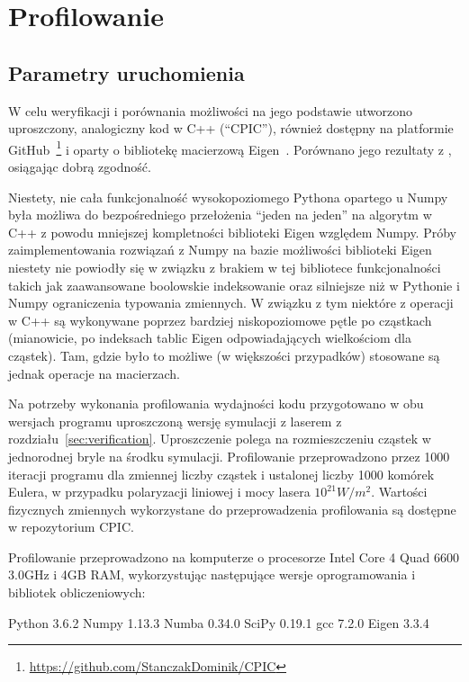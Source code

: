 \section[Profilowanie]{Profilowanie}\label{sec:profiling} 

\subsection{Parametry uruchomienia}

W celu weryfikacji i porównania możliwości \pythonpic{} na jego podstawie
utworzono uproszczony, analogiczny kod w C++ (``CPIC''), również dostępny na platformie
GitHub~\footnote{\url{https://github.com/StanczakDominik/CPIC}} i oparty o bibliotekę macierzową Eigen~\cite{eigen}.
Porównano jego rezultaty z \pythonpic{}, osiągając dobrą zgodność.

Niestety, nie cała funkcjonalność wysokopoziomego Pythona opartego u Numpy była możliwa do bezpośredniego przełożenia ``jeden na jeden'' na algorytm
w C++ z powodu mniejszej kompletności biblioteki Eigen względem Numpy. Próby zaimplementowania rozwiązań z Numpy na bazie możliwości biblioteki Eigen niestety nie powiodły się w związku z
brakiem w tej bibliotece funkcjonalności takich jak zaawansowane boolowskie indeksowanie oraz silniejsze niż w Pythonie i Numpy ograniczenia typowania zmiennych.  
W związku z tym niektóre z operacji w C++ są wykonywane poprzez bardziej niskopoziomowe pętle po cząstkach (mianowicie, po indeksach tablic Eigen odpowiadających wielkościom dla cząstek).
Tam, gdzie było to możliwe (w większości przypadków) stosowane są jednak operacje na macierzach.

Na potrzeby wykonania profilowania wydajności kodu przygotowano w obu wersjach
programu uproszczoną wersję symulacji z laserem z rozdziału~\ref{sec:verification}.
Uproszczenie polega na rozmieszczeniu cząstek w jednorodnej bryle na środku symulacji.
Profilowanie przeprowadzono przez 1000 iteracji programu dla zmiennej liczby cząstek i ustalonej liczby 1000
komórek Eulera, w przypadku polaryzacji liniowej i mocy lasera $10^{21} W/m^2$.
Wartości fizycznych zmiennych wykorzystane do przeprowadzenia profilowania są dostępne w repozytorium CPIC.

Profilowanie przeprowadzono na komputerze o procesorze 
Intel Core 4 Quad 6600 3.0GHz i 4GB RAM, wykorzystując następujące wersje
oprogramowania i bibliotek obliczeniowych:
\begin{itemize}
\itemi{} Python 3.6.2
\itemi{} Numpy 1.13.3
\itemi{} Numba 0.34.0
\itemi{} SciPy 0.19.1
\itemi{} gcc 7.2.0
\itemi{} Eigen 3.3.4
\end{itemize}

